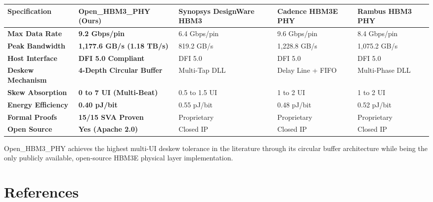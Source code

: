 \documentclass[journal,10pt,twocolumn]{IEEEtran}
\begin{document}
\begin{table}[htbp]
\centering\footnotesize
\begin{tabular}{p{} p{} p{} p{} p{}}
\toprule
\textbf{Specification} & \textbf{Open\_HBM3\_PHY (Ours)} & \textbf{Synopsys DesignWare HBM3} & \textbf{Cadence HBM3E PHY} & \textbf{Rambus HBM3 PHY} \\
\midrule
\textbf{Max Data Rate} & \textbf{9.2 Gbps/pin} & 6.4 Gbps/pin & 9.6 Gbps/pin & 8.4 Gbps/pin \\
\textbf{Peak Bandwidth} & \textbf{1,177.6 GB/s (1.18 TB/s)} & 819.2 GB/s & 1,228.8 GB/s & 1,075.2 GB/s \\
\textbf{Host Interface} & \textbf{DFI 5.0 Compliant} & DFI 5.0 & DFI 5.0 & DFI 5.0 \\
\textbf{Deskew Mechanism} & \textbf{4-Depth Circular Buffer} & Multi-Tap DLL & Delay Line + FIFO & Multi-Phase DLL \\
\textbf{Skew Absorption} & \textbf{0 to 7 UI (Multi-Beat)} & 0.5 to 1.5 UI & 1 to 2 UI & 1 to 2 UI \\
\textbf{Energy Efficiency} & \textbf{0.40 pJ/bit} & 0.55 pJ/bit & 0.48 pJ/bit & 0.52 pJ/bit \\
\textbf{Formal Proofs} & \textbf{15/15 SVA Proven} & Proprietary & Proprietary & Proprietary \\
\textbf{Open Source} & \textbf{Yes (Apache 2.0)} & Closed IP & Closed IP & Closed IP \\
\bottomrule
\end{tabular}
\vspace{4pt}
\end{table}

Open\_HBM3\_PHY achieves the highest multi-UI deskew tolerance in the literature through its circular buffer architecture while being the only publicly available, open-source HBM3E physical layer implementation.


\section{References}
\end{document}
